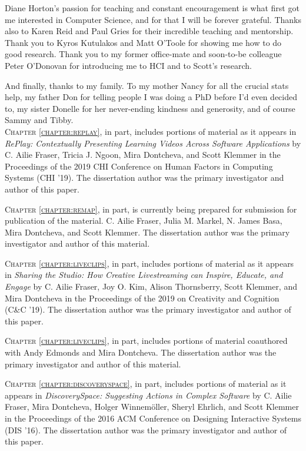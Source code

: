 Diane Horton's passion for teaching and constant encouragement is what first got me interested in Computer Science, and for that I will be forever grateful. Thanks also to Karen Reid and Paul Gries for their incredible teaching and mentorship. Thank you to Kyros Kutulakos and Matt O'Toole for showing me how to do good research. Thank you to my former office-mate and soon-to-be colleague Peter O'Donovan for introducing me to HCI and to Scott's research.

And finally, thanks to my family. To my mother Nancy for all the crucial stats help, my father Don for telling people I was doing a PhD before I'd even decided to, my sister Donelle for her never-ending kindness and generosity, and of course Sammy and Tibby.
\\

\textsc{Chapter \ref{chapter:replay}}, in part, includes portions of material as it appears in \textit{RePlay: Contextually Presenting Learning Videos Across Software Applications} by C. Ailie Fraser, Tricia J. Ngoon, Mira Dontcheva, and Scott Klemmer in the Proceedings of the 2019 CHI Conference on Human Factors in Computing Systems (CHI '19). The dissertation author was the primary investigator and author of this paper.

\textsc{Chapter \ref{chapter:remap}}, in part, is currently being prepared for submission for publication of the material. C. Ailie Fraser, Julia M. Markel, N. James Basa, Mira Dontcheva, and Scott Klemmer. The dissertation author was the primary investigator and author of this material.

\textsc{Chapter \ref{chapter:liveclips}}, in part, includes portions of material as it appears in \textit{Sharing the Studio: How Creative Livestreaming can Inspire, Educate, and Engage} by C. Ailie Fraser, Joy O. Kim, Alison Thornsberry, Scott Klemmer, and Mira Dontcheva in the Proceedings of the 2019 on Creativity and Cognition (C\&C '19). The dissertation author was the primary investigator and author of this paper.

\textsc{Chapter \ref{chapter:liveclips}}, in part, includes portions of material coauthored with Andy Edmonds and Mira Dontcheva. The dissertation author was the primary investigator and author of this material.

\textsc{Chapter \ref{chapter:discoveryspace}}, in part, includes portions of material as it appears in \textit{DiscoverySpace: Suggesting Actions in Complex Software} by C. Ailie Fraser, Mira Dontcheva, Holger Winnemöller, Sheryl Ehrlich, and Scott Klemmer in the Proceedings of the 2016 ACM Conference on Designing Interactive Systems (DIS '16). The dissertation author was the primary investigator and author of this paper.

